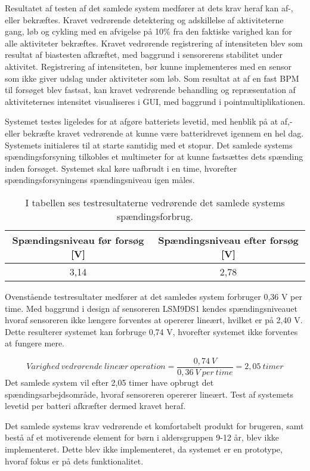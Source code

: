 Resultatet af testen af det samlede system medfører at dets krav heraf kan af-, eller bekræftes. Kravet vedrørende detektering og adskillelse af aktiviteterne gang, løb og cykling med en afvigelse på 10\% fra den faktiske varighed kan for alle aktiviteter bekræftes. Kravet vedrørende registrering af intensiteten blev som resultat af biastesten afkræftet, med baggrund i sensorerens stabilitet under aktivitet. Registrering af intensiteten, bør kunne implementeres med en sensor som ikke giver udslag under aktiviteter som løb. Som resultat at af en fast BPM til forsøget blev fastsat, kan kravet vedrørende behandling og repræsentation af aktiviteternes intensitet visualiseres i GUI, med baggrund i pointmultiplikationen. 

Systemet testes ligeledes for at afgøre batteriets levetid, med henblik på at af,- eller bekræfte kravet vedrørende at kunne være batteridrevet igennem en hel dag. Systemets initialeres til at starte samtidig med et stopur. Det samlede systems spændingsforsyning tilkobles et multimeter for at kunne fastsættes dets spænding inden forsøget. Systemet skal køre uafbrudt i en time, hvorefter spændingsforsyningens spændingsniveau igen måles. 

\begin{table}[H]
	\centering
	\begin{tabular}{cc}
		\hline
		\rowcolor[HTML]{C0C0C0} 
		Spændingsniveau før forsøg {[}V{]} & Spændingsniveau efter forsøg {[}V{]} \\ \hline
		3,14 & 2,78 \\ \hline
	\end{tabular}
	\caption{I tabellen ses testresultaterne vedrørende det samlede systems spændingsforbrug.}
	\label{tab:test_spaending}
\end{table} \vspace{-.5cm}
Ovenstående testresultater medfører at det samledes system forbruger 0,36 V per time. Med baggrund i design af sensoreren LSM9DS1 kendes spændingsniveauet hvoraf sensoreren ikke længere forventes at opererer lineært, hvilket er på 2,40 V. Dette resulterer systemet kan forbruge 0,74 V, hvorefter systemet ikke forventes at fungere mere. 

\begin{equation}
Varighed~vedr\text{ø}rende~line\text{æ}r~operation = \frac{0,74~V}{0,36~V~per~time} = 2,05~timer
\end{equation}   
Det samlede system vil efter 2,05 timer have opbrugt det spændingsarbejdsområde, hvoraf sensoreren opererer lineært. Test af systemets levetid per batteri afkræfter dermed kravet heraf.

Det samlede systems krav vedrørende et komfortabelt produkt for brugeren, samt bestå af et motiverende element for børn i aldersgruppen 9-12 år, blev ikke implementeret. Dette blev ikke implementeret, da systemet er en prototype, hvoraf fokus er på dets funktionalitet. 